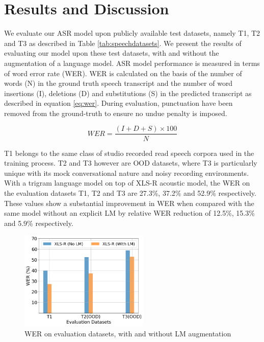 \documentclass[runningheads]{llncs}
\begin{document}
\section{Results and Discussion}

We evaluate our ASR model upon publicly available test datasets, namely T1, T2 and T3 as described in Table \ref{tab:speechdatasets}.  We present the 
results of evaluating our model upon these test datasets, with and without the augmentation of a language model. ASR model performance is measured in terms of word error rate (WER). WER is calculated on the basis of the number of words (N) in the ground truth speech transcript and the number of word insertions (I), deletions (D) and  substitutions (S)  in the  predicted transcript as described in equation \ref{eq:wer}. During evaluation, punctuation have been removed from the ground-truth to ensure no undue penalty is imposed.

\begin{equation}
	\label{eq:wer}
	WER = \frac{(I+D+S) \times 100}{N}
\end{equation}


T1 belongs to the same class of studio recorded read speech corpora used in the training process. T2 and T3 however are OOD datasets, where T3 is particularly unique with its mock conversational nature and noisy recording environments. With a trigram language model on top of XLS-R acoustic model, the WER on the evaluation datasets T1, T2 and T3 are 27.3\%, 37.2\% and 52.9\% respectively. These values show a substantial improvement in WER when compared with the same model without an explicit LM by relative WER reduction of 12.5\%, 15.3\% and 5.9\% respectively.

\begin{figure}[htpb]
    \centering
    \includegraphics[width=0.55\textwidth]{wer.png}
    \caption{WER on evaluation datasets, with and without LM augmentation}
    \label{Fig:WEReval}

\end{figure}
\end{document}
